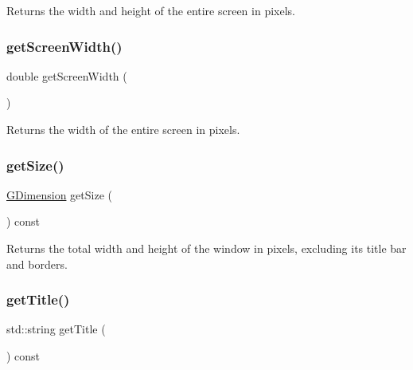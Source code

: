 Returns the width and height of the entire screen in pixels. 

\mbox{\label{classsgl_1_1GWindow_adc82933bd579ab83d7cd4e3bc5f79a12}} 
\subsubsection{\texorpdfstring{get\+Screen\+Width()}{getScreenWidth()}}
{\footnotesize\ttfamily double get\+Screen\+Width (\begin{DoxyParamCaption}{ }\end{DoxyParamCaption})\hspace{0.3cm}{\ttfamily [static]}}



Returns the width of the entire screen in pixels. 

\mbox{\label{classsgl_1_1GWindow_a7b4eec96a2bdc6420695d5796a78eea9}} 
\subsubsection{\texorpdfstring{get\+Size()}{getSize()}}
{\footnotesize\ttfamily \mbox{\hyperlink{structsgl_1_1GDimension}{G\+Dimension}} get\+Size (\begin{DoxyParamCaption}{ }\end{DoxyParamCaption}) const\hspace{0.3cm}{\ttfamily [virtual]}}



Returns the total width and height of the window in pixels, excluding its title bar and borders. 

\mbox{\label{classsgl_1_1GWindow_abc7651e67987c4682fed77d92a860bba}} 
\subsubsection{\texorpdfstring{get\+Title()}{getTitle()}}
{\footnotesize\ttfamily std\+::string get\+Title (\begin{DoxyParamCaption}{ }\end{DoxyParamCaption}) const\hspace{0.3cm}{\ttfamily [virtual]}}



